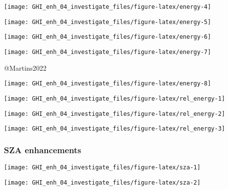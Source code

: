 \documentclass[
  10pt,
  a4paper,oneside]{article}
\begin{document}
\begin{center}\texttt{[image: GHI\_enh\_04\_investigate\_files/figure-latex/energy-4]} \end{center}

\begin{center}\texttt{[image: GHI\_enh\_04\_investigate\_files/figure-latex/energy-5]} \end{center}

\begin{center}\texttt{[image: GHI\_enh\_04\_investigate\_files/figure-latex/energy-6]} \end{center}

\begin{center}\texttt{[image: GHI\_enh\_04\_investigate\_files/figure-latex/energy-7]} \end{center}

@Martins2022

\begin{center}\texttt{[image: GHI\_enh\_04\_investigate\_files/figure-latex/energy-8]} \end{center}

\begin{center}\texttt{[image: GHI\_enh\_04\_investigate\_files/figure-latex/rel\_energy-1]} \end{center}

\begin{center}\texttt{[image: GHI\_enh\_04\_investigate\_files/figure-latex/rel\_energy-2]} \end{center}

\begin{center}\texttt{[image: GHI\_enh\_04\_investigate\_files/figure-latex/rel\_energy-3]} \end{center}

\newpage
\FloatBarrier

\hypertarget{sza-enhancements}{%
\subsubsection{SZA enhancements}\label{sza-enhancements}}

\begin{center}\texttt{[image: GHI\_enh\_04\_investigate\_files/figure-latex/sza-1]} \end{center}

\begin{center}\texttt{[image: GHI\_enh\_04\_investigate\_files/figure-latex/sza-2]} \end{center}
\end{document}
